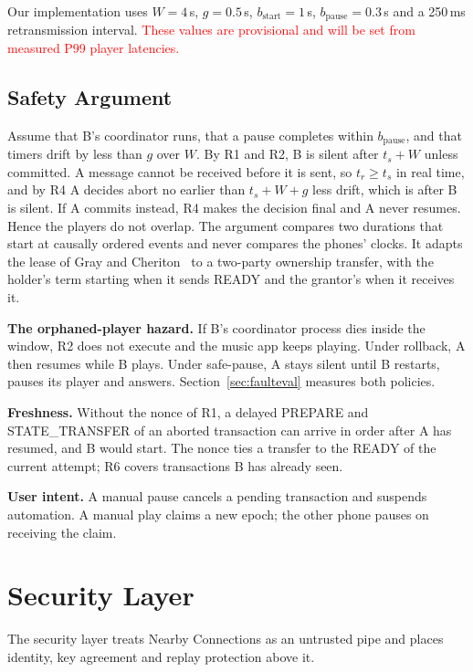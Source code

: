 \documentclass[conference]{IEEEtran}
\newcommand{\draftnote}[1]{\textcolor{red}{#1}}
\begin{document}
Our implementation uses $W=4$\,s, $g=0.5$\,s, $b_{\mathrm{start}}=1$\,s, $b_{\mathrm{pause}}=0.3$\,s and a 250\,ms retransmission interval. \draftnote{These values are provisional and will be set from measured P99 player latencies.}

\subsection{Safety Argument}

Assume that B's coordinator runs, that a pause completes within $b_{\mathrm{pause}}$, and that timers drift by less than $g$ over $W$. By R1 and R2, B is silent after $t_s+W$ unless committed. A message cannot be received before it is sent, so $t_r \ge t_s$ in real time, and by R4 A decides abort no earlier than $t_s + W + g$ less drift, which is after B is silent. If A commits instead, R4 makes the decision final and A never resumes. Hence the players do not overlap. The argument compares two durations that start at causally ordered events and never compares the phones' clocks. It adapts the lease of Gray and Cheriton~\cite{gray1989} to a two-party ownership transfer, with the holder's term starting when it sends READY and the grantor's when it receives it.

\textbf{The orphaned-player hazard.} If B's coordinator process dies inside the window, R2 does not execute and the music app keeps playing. Under rollback, A then resumes while B plays. Under safe-pause, A stays silent until B restarts, pauses its player and answers. Section~\ref{sec:faulteval} measures both policies.

\textbf{Freshness.} Without the nonce of R1, a delayed PREPARE and STATE\_TRANSFER of an aborted transaction can arrive in order after A has resumed, and B would start. The nonce ties a transfer to the READY of the current attempt; R6 covers transactions B has already seen.

\textbf{User intent.} A manual pause cancels a pending transaction and suspends automation. A manual play claims a new epoch; the other phone pauses on receiving the claim.

\section{Security Layer}\label{sec:security}

The security layer treats Nearby Connections as an untrusted pipe and places identity, key agreement and replay protection above it.
\end{document}
